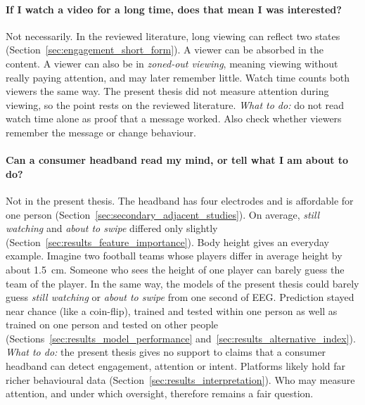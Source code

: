 \documentclass[12pt,a4paper]{report}
\begin{document}
\paragraph{If I watch a video for a long time, does that mean I was interested?}
Not necessarily. In the reviewed literature, long viewing can reflect two states \cite{baughan_i_2022, knierim_flow_2026} (Section~\ref{sec:engagement_short_form}). A viewer can be absorbed in the content. A viewer can also be in \emph{zoned-out viewing}, meaning viewing without really paying attention, and may later remember little. Watch time counts both viewers the same way. The present thesis did not measure attention during viewing, so the point rests on the reviewed literature.
\emph{What to do:} do not read watch time alone as proof that a message worked. Also check whether viewers remember the message or change behaviour.

\paragraph{Can a consumer headband read my mind, or tell what I am about to do?}
Not in the present thesis. The headband has four electrodes and is affordable for one person (Section~\ref{sec:secondary_adjacent_studies}). On average, \emph{still watching} and \emph{about to swipe} differed only slightly (Section~\ref{sec:results_feature_importance}). Body height gives an everyday example. Imagine two football teams whose players differ in average height by about 1.5~cm. Someone who sees the height of one player can barely guess the team of the player. In the same way, the models of the present thesis could barely guess \emph{still watching} or \emph{about to swipe} from one second of EEG. Prediction stayed near chance (like a coin-flip), trained and tested within one person as well as trained on one person and tested on other people (Sections~\ref{sec:results_model_performance} and~\ref{sec:results_alternative_index}).
\emph{What to do:} the present thesis gives no support to claims that a consumer headband can detect engagement, attention or intent. Platforms likely hold far richer behavioural data (Section~\ref{sec:results_interpretation}). Who may measure attention, and under which oversight, therefore remains a fair question.
\end{document}
